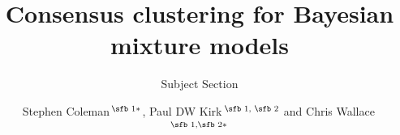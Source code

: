 \documentclass{bioinfo}
\begin{document}

\subtitle{Subject Section}

\title[Consensus clustering for Bayesian mixture models]{Consensus clustering for Bayesian mixture models}
\author[Sample \textit{et~al}.]{Stephen Coleman\,$^{\text{\sfb 1}*}$, Paul DW Kirk\,$^{\text{\sfb 1, \sfb 2}}$ and Chris Wallace\,$^{\text{\sfb 1,\sfb 2}*}$}
\address{$^{\text{\sf 1}}$MRC Biostatistics Unit, University of Cambridge, Cambridge, CB2 0SR, United Kingdom and \\
$^{\text{\sf 2}}$Department of Medicine, University of Cambridge, Cambridge, CB2 0AW, United Kingdom.}



\end{document}
